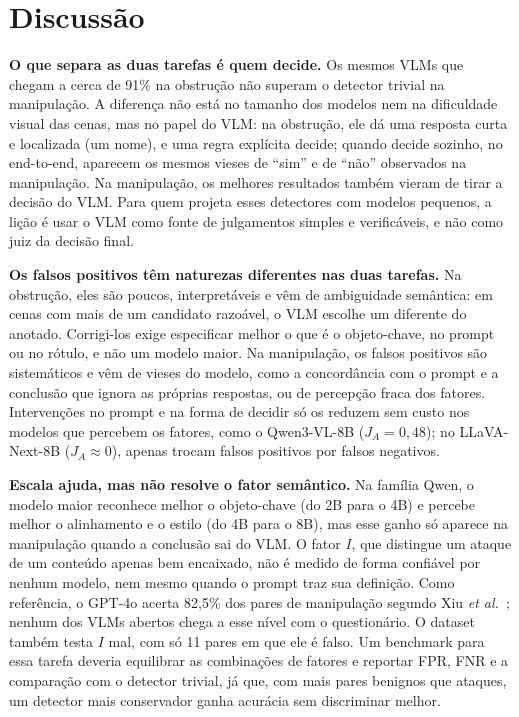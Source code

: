\documentclass[conference]{IEEEtran}
\begin{document}
\section{Discussão}
\label{sec:disc}

\textbf{O que separa as duas tarefas é quem decide.} Os mesmos VLMs que chegam a cerca de 91\% na
obstrução não superam o detector trivial na manipulação. A diferença não está no tamanho dos modelos nem
na dificuldade visual das cenas, mas no papel do VLM: na obstrução, ele dá uma resposta curta e
localizada (um nome), e uma regra explícita decide; quando decide sozinho, no end-to-end, aparecem os
mesmos vieses de ``sim'' e de ``não'' observados na manipulação. Na manipulação, os melhores resultados
também vieram de tirar a decisão do VLM. Para quem projeta esses detectores com modelos pequenos, a
lição é usar o VLM como fonte de julgamentos simples e verificáveis, e não como juiz da decisão final.

\textbf{Os falsos positivos têm naturezas diferentes nas duas tarefas.} Na obstrução, eles são poucos,
interpretáveis e vêm de ambiguidade semântica: em cenas com mais de um candidato razoável, o VLM escolhe
um diferente do anotado. Corrigi-los exige especificar melhor o que é o objeto-chave, no prompt ou no
rótulo, e não um modelo maior. Na manipulação, os falsos positivos são sistemáticos e vêm de vieses do
modelo, como a concordância com o prompt e a conclusão que ignora as próprias respostas, ou de percepção
fraca dos fatores. Intervenções no prompt e na forma de decidir só os reduzem sem custo nos modelos que
percebem os fatores, como o Qwen3-VL-8B ($J_A=0{,}48$); no LLaVA-Next-8B ($J_A\approx 0$), apenas trocam
falsos positivos por falsos negativos.

\textbf{Escala ajuda, mas não resolve o fator semântico.} Na família Qwen, o modelo maior reconhece
melhor o objeto-chave (do 2B para o 4B) e percebe melhor o alinhamento e o estilo (do 4B para o 8B), mas
esse ganho só aparece na manipulação quando a conclusão sai do VLM. O fator $I$, que distingue um ataque
de um conteúdo apenas bem encaixado, não é medido de forma confiável por nenhum modelo, nem mesmo quando
o prompt traz sua definição. Como referência, o GPT-4o acerta 82,5\% dos pares de manipulação segundo
Xiu \emph{et al.}~\cite{viddar}; nenhum dos VLMs abertos chega a esse nível com o questionário. O dataset também
testa $I$ mal, com só 11 pares em que ele é falso. Um benchmark para essa tarefa deveria equilibrar as
combinações de fatores e reportar FPR, FNR e a comparação com o detector trivial, já que, com mais pares
benignos que ataques, um detector mais conservador ganha acurácia sem discriminar melhor.
\end{document}
